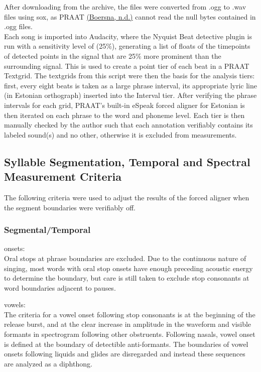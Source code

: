 \documentclass[11pt]{article}
\begin{document}
After downloading from the archive, the files were converted from .ogg to .wav files  using sox, as PRAAT\cite{PRAAT} \hyperref[csl:2]{(Boersna, n.d.)} cannot read the null bytes contained in .ogg files. \\
Each song is imported into Audacity\cite{}, where the Nyquist Beat detective plugin \cite{} is run with a sensitivity level of (25\%), generating a list of floats of the timepoints of detected points in the signal that are 25\% more prominent than the surrounding signal. This is used to create a point tier of each beat in a PRAAT Textgrid. The textgrids from this script were then the basis for the analysis tiers: first, every eight beats is taken as a large phrase interval, its appropriate lyric line (in Estonian orthograph) inserted into the Interval tier. After verifying the phrase intervals for each grid, PRAAT's built-in eSpeak forced aligner for Estonian is then iterated on each phrase to the word and phoneme level. Each tier is then manually checked by the author such that each annotation verifiably contains its labeled sound(s) and no other, otherwise it is excluded from measurements. \\
\subsection*{Syllable Segmentation, Temporal and Spectral Measurement Criteria}

The following criteria were used to adjust the results of the forced aligner when the segment boundaries were verifiably off. \\
\subsubsection*{Segmental/Temporal}
onsets: \\

Oral stops at phrase boundaries are excluded. Due to the continuous nature of singing, most words with oral stop onsets have enough preceding acoustic energy to determine the boundary, but care is still taken to exclude stop consonants at word boundaries adjacent to pauses. 

vowels:\\
The criteria for a vowel onset following stop consonants is at the beginning of the release burst,
and at the clear increase in amplitude in the waveform and visible formants in spectrogram following other obstruents. Following nasals, vowel onset is defined at the boundary of detectible anti-formants. The boundaries of vowel onsets following liquids and glides are disregarded and instead these sequences are analyzed as a diphthong.
\end{document}
